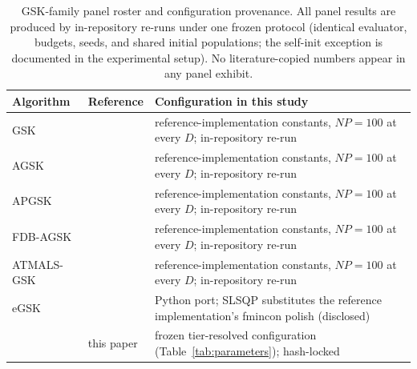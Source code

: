 \begin{table}[H]
\caption{GSK-family panel roster and configuration provenance.
All panel results are produced by in-repository
re-runs under one frozen protocol (identical evaluator, budgets,
seeds, and shared initial populations; the \dtgsk{} self-init
exception is documented in the experimental setup). No
literature-copied numbers appear in any panel exhibit.}
\label{tab:panel}
\centering
\small
\begin{tabular}{lll}
\toprule
\textbf{Algorithm} & \textbf{Reference} & \textbf{Configuration in this study}\\
\midrule
GSK & \cite{mohamed2020gaining} & reference-implementation constants, $NP=100$ at every $D$; in-repository re-run\\
AGSK & \cite{mohamed2020agsk} & reference-implementation constants, $NP=100$ at every $D$; in-repository re-run\\
APGSK & \cite{apgsk2021} & reference-implementation constants, $NP=100$ at every $D$; in-repository re-run\\
FDB-AGSK & \cite{fdbagsk2023} & reference-implementation constants, $NP=100$ at every $D$; in-repository re-run\\
ATMALS-GSK & \cite{alfadli2025atmals} & reference-implementation constants, $NP=100$ at every $D$; in-repository re-run\\
eGSK & \cite{jawad2024egsk} & Python port; SLSQP substitutes the
reference implementation's fmincon polish (disclosed)\\
\dtgsk{} & this paper & frozen tier-resolved configuration
(Table~\ref{tab:parameters}); hash-locked\\
\bottomrule
\end{tabular}
\end{table}

